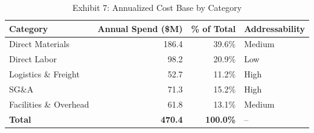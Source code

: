 \begin{table}[htbp]
\centering
\small
\begin{tabular}{@{}lrrl@{}}
\toprule
\textbf{Category} & \textbf{Annual Spend (\$M)} & \textbf{\% of Total} & \textbf{Addressability} \\
\midrule
Direct Materials          & 186.4 & 39.6\%  & Medium \\
Direct Labor              & 98.2  & 20.9\%  & Low \\
Logistics \& Freight      & 52.7  & 11.2\%  & High \\
SG\&A                     & 71.3  & 15.2\%  & High \\
Facilities \& Overhead    & 61.8  & 13.1\%  & Medium \\
\midrule
\rowcolor{lightgrey}
\textbf{Total}             & \textbf{470.4} & \textbf{100.0\%} & -- \\
\bottomrule
\end{tabular}
\caption{Exhibit 7: Annualized Cost Base by Category}
\end{table}

\clearpage

